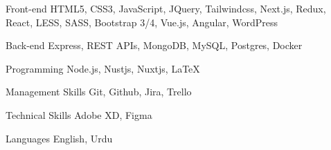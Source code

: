 

\begin{cvskills}

  \cvskill
    {Front-end} %
    {HTML5, CSS3, JavaScript, JQuery, Tailwindcss, Next.js, Redux, React, LESS, SASS, Bootstrap 3/4, Vue.js, Angular, WordPress} %

  \cvskill
    {Back-end} %
    {Express, REST APIs, MongoDB, MySQL, Postgres, Docker } %

  \cvskill
    {Programming} %
    {Node.js, Nustjs, Nuxtjs, LaTeX} %

  \cvskill
    {Management Skills} %
    {Git, Github, Jira, Trello} %

  \cvskill
    {Technical Skills} %
    {Adobe XD, Figma} %

  \cvskill
    {Languages} %
    {English, Urdu} %

\end{cvskills}
